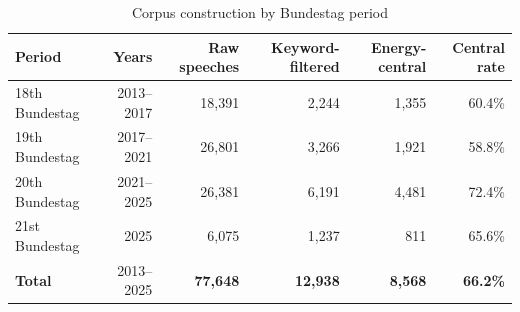 \begin{table}[H]
\centering
\caption{Corpus construction by Bundestag period}
\label{tab:corpus}
\begin{threeparttable}
\begin{tabular}{lrrrrr}
\toprule
Period & Years & Raw speeches & Keyword-filtered & Energy-central & Central rate \\
\midrule
18th Bundestag & 2013--2017 & 18,391 & 2,244 & 1,355 & 60.4\% \\
19th Bundestag & 2017--2021 & 26,801 & 3,266 & 1,921 & 58.8\% \\
20th Bundestag & 2021--2025 & 26,381 & 6,191 & 4,481 & 72.4\% \\
21st Bundestag & 2025 & 6,075 & 1,237 & 811 & 65.6\% \\
\midrule
\textbf{Total} & 2013--2025 & \textbf{77,648} & \textbf{12,938} & \textbf{8,568} & \textbf{66.2\%} \\
\bottomrule
\end{tabular}
\end{threeparttable}
\end{table}
